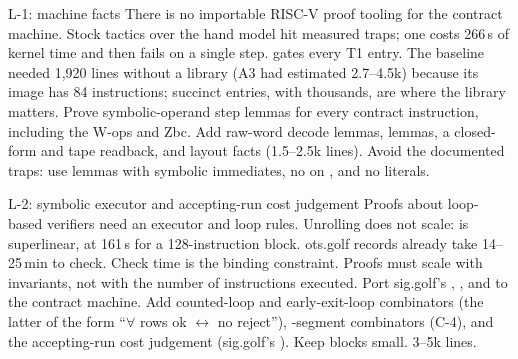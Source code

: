 \begin{issue}{L-1}{: machine facts}
\IRprob There is no importable RISC-V proof tooling for the contract machine. Stock tactics over
the hand model hit measured traps; one costs 266\,s of kernel time and then fails on a single
 step.
\IRwhy {} gates every T1 entry. The baseline needed 1{,}920 lines without a library (A3 had
estimated 2.7--4.5k) because its image has 84 instructions; succinct entries, with thousands, are
where the library matters.
\IRres Prove symbolic-operand step lemmas for every contract instruction, including the W-ops and
Zbc. Add raw-word decode lemmas,  lemmas, a closed-form  and tape
readback, and layout facts (1.5--2.5k lines). Avoid the documented traps: use lemmas with
symbolic immediates, no  on , and no  literals.
\end{issue}

\begin{issue}{L-2}{: symbolic executor and accepting-run cost judgement}
\IRprob Proofs about loop-based verifiers need an executor and loop rules. Unrolling does not
scale:  is superlinear, at 161\,s for a 128-instruction block. ots.golf records
already take 14--25\,min to check.
\IRwhy Check time is the binding constraint. Proofs must scale with invariants, not with the
number of instructions executed.
\IRres Port sig.golf's , ,  and
 to the contract machine. Add counted-loop and early-exit-loop combinators (the
latter of the form \enquote{$\forall$ rows ok $\leftrightarrow$ no reject}), -segment
combinators (C-4), and the accepting-run cost judgement (sig.golf's ). Keep blocks small.
3--5k lines.
\end{issue}

